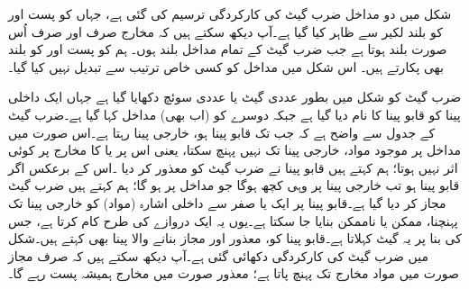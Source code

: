 شکل    میں دو مداخل   ضرب گیٹ کی کارکردگی  ترسیم  کی گئی ہے، جہاں  کو پست اور  کو بلند لکیر سے ظاہر کیا گیا ہے۔آپ دیکھ سکتے ہیں کہ مخارج صرف اور صرف اُس صورت بلند  ہوتا ہے جب ضرب گیٹ کے تمام مداخل بلند ہوں۔ ہم  کو پست اور  کو بلند بھی پکارتے ہیں۔ اس شکل میں  مداخل کو کسی خاص ترتیب سے  تبدیل نہیں  کیا گیا۔


ضرب گیٹ کو شکل  میں بطور  عددی گیٹ یا عددی سوئچ  دکھایا گیا ہے جہاں  ایک داخلی پینا  کو قابو پینا  کا نام دیا گیا ہے جبکہ دوسرے کو   (اب بھی)  مداخل کہا گیا ہے۔ضرب گیٹ کے جدول سے واضح ہے کہ جب تک قابو پینا   ہو،   خارجی پینا     رہتا ہے۔اس صورت میں   مداخل  پر موجود مواد، خارجی پینا تک نہیں پہنچ سکتا،  یعنی   اس   پر  یا   کا مخارج پر کوئی اثر نہیں ہوتا؛  ہم کہتے  ہیں قابو پینا نے ضرب گیٹ کو معذور   کر دیا ۔اس کے برعکس اگر قابو پینا   ہو تب خارجی پینا پر وہی کچھ ہوگا جو مداخل پر ہو گا؛ ہم کہتے  ہیں  ضرب گیٹ مجاز   کر دیا گیا ہے۔قابو پینا پر ایک یا صفر  سے داخلی اشارہ  (مواد) کو خارجی پینا تک پہنچنا،  ممکن یا ناممکن بنایا جا سکتا ہے۔یوں یہ ایک دروازے کی طرح کام کرتا ہے، جس   کی بنا   پر  یہ  گیٹ  کہلاتا ہے۔قابو پینا کو،  معذور اور مجاز بنانے والا پینا بھی کہتے ہیں۔شکل    میں ضرب   گیٹ کی  کارکردگی دکھائی گئی ہے۔آپ دیکھ سکتے ہیں کہ  صرف مجاز صورت میں مواد مخارج تک پہنچ پاتا ہے؛ معذور صورت میں مخارج ہمیشہ پست رہے گا۔

